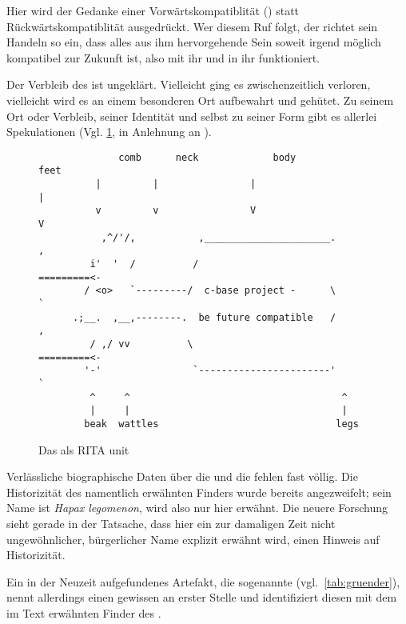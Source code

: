 Hier wird der Gedanke einer Vorwärtskompatiblität () statt Rückwärtskompatiblität ausgedrückt. Wer diesem Ruf folgt, der richtet sein Handeln so ein, dass alles aus ihm hervorgehende Sein  soweit irgend möglich kompatibel zur Zukunft ist, also mit ihr und in ihr funktioniert.

Der Verbleib des  ist ungeklärt. Vielleicht ging es zwischenzeitlich verloren, vielleicht wird es an einem besonderen Ort aufbewahrt und gehütet. Zu seinem Ort oder Verbleib, seiner Identität und selbst zu seiner Form gibt es allerlei Spekulationen (Vgl. \cref{fig:chicken}, in Anlehnung an \cite{rfc2321bressen}).  


\begin{figure}[ht!]
    \centering\small
    \begin{verbatim}
              comb      neck             body                    feet
          |         |                |                       |
          v         v                V                       V
           ,^/'/,           ,______________________.         ,
         i'  '  /          /                       =========<-
        / <o>   `---------/  c-base project -      \         `
      .;__.  ,__,--------.  be future compatible   /         ,
         / ,/ vv          \                        =========<-
        '-'                `-----------------------'         `
         ^     ^                                     ^
         |     |                                     |
        beak  wattles                               legs
    \end{verbatim}
    \caption{Das  als RITA unit}
    \label{fig:chicken}
\end{figure}

Verlässliche biographische Daten über die  und die  fehlen fast völlig. 
Die Historizität des namentlich erwähnten Finders wurde bereits angezweifelt; sein Name ist \emph{Hapax legomenon}, wird also nur hier erwähnt. Die neuere Forschung sieht gerade in der Tatsache, dass hier ein zur damaligen Zeit nicht ungewöhnlicher, bürgerlicher Name explizit erwähnt wird, einen Hinweis auf Historizität. 

Ein in der Neuzeit aufgefundenes Artefakt, die sogenannte  (vgl.~\cref{tab:gruender}), nennt allerdings einen gewissen  an erster Stelle und identifiziert diesen mit dem im Text erwähnten Finder des . 

